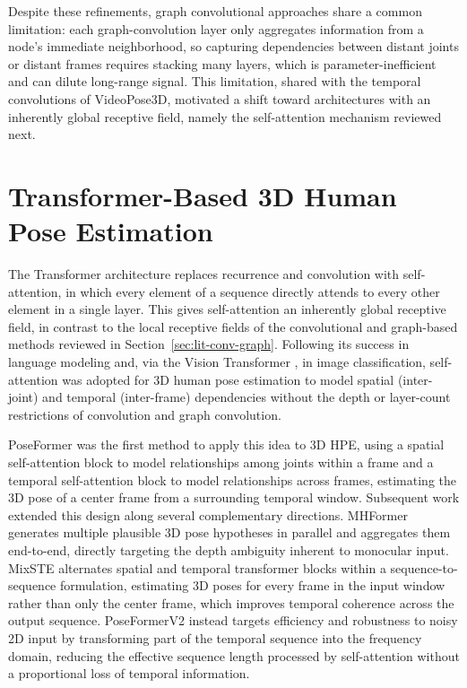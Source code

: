 Despite these refinements, graph convolutional approaches share a common
limitation: each graph-convolution layer only aggregates information from
a node's immediate neighborhood, so capturing dependencies between distant
joints or distant frames requires stacking many layers, which is
parameter-inefficient and can dilute long-range signal. This limitation,
shared with the temporal convolutions of VideoPose3D, motivated a shift
toward architectures with an inherently global receptive field, namely
the self-attention mechanism reviewed next.

\section{Transformer-Based 3D Human Pose Estimation}
\label{sec:lit-transformer}

The Transformer architecture \cite{vaswani2017attention} replaces
recurrence and convolution with self-attention, in which every element of
a sequence directly attends to every other element in a single layer.
This gives self-attention an inherently global receptive field, in
contrast to the local receptive fields of the convolutional and
graph-based methods reviewed in Section~\ref{sec:lit-conv-graph}. Following
its success in language modeling and, via the Vision Transformer
\cite{dosovitskiy2020vit}, in image classification, self-attention was
adopted for 3D human pose estimation to model spatial (inter-joint) and
temporal (inter-frame) dependencies without the depth or layer-count
restrictions of convolution and graph convolution.

PoseFormer \cite{zheng2021poseformer} was the first method to apply this
idea to 3D HPE, using a spatial self-attention block to model relationships
among joints within a frame and a temporal self-attention block to model
relationships across frames, estimating the 3D pose of a center frame from
a surrounding temporal window. Subsequent work extended this design along
several complementary directions. MHFormer \cite{li2022mhformer} generates
multiple plausible 3D pose hypotheses in parallel and aggregates them
end-to-end, directly targeting the depth ambiguity inherent to monocular
input. MixSTE \cite{zhang2022mixste} alternates spatial and temporal
transformer blocks within a sequence-to-sequence formulation, estimating
3D poses for every frame in the input window rather than only the center
frame, which improves temporal coherence across the output sequence.
PoseFormerV2 \cite{zhao2023poseformerv2} instead targets efficiency and
robustness to noisy 2D input by transforming part of the temporal sequence
into the frequency domain, reducing the effective sequence length
processed by self-attention without a proportional loss of temporal
information.

